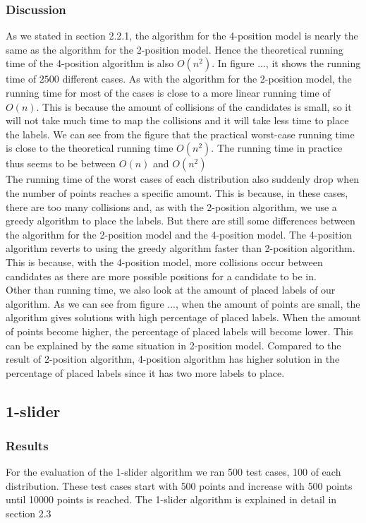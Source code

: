 \documentclass[crop=false,a4paper,oneside,11pt]{standalone}
\begin{document}
\subsubsection{Discussion}
As we stated in section 2.2.1, the algorithm for the 4-position model is nearly the same as the algorithm for the 2-position model. Hence the theoretical running time of the 4-position algorithm is also $O(n^2)$. In figure ..., it shows the running time of $2500$ different cases. As with the algorithm for the 2-position model, the running time for most of the cases is close to a more linear running time of $O(n)$. This is because the amount of collisions of the candidates is small, so it will not take much time to map the collisions and it will take less time to place the labels. We can see from the figure that the practical worst-case running time is close to the theoretical running time $O(n^2)$. The running time in practice thus seems to be between $O(n)$ and $O(n^2)$  \\
The running time of the worst cases of each distribution also suddenly drop when the number of points reaches a specific amount. This is because, in these cases, there are too many collisions and, as with the 2-position algorithm, we use a greedy algorithm to place the labels. But there are still some differences between the algorithm for the 2-position model and the 4-position model. The 4-position algorithm reverts to using the greedy algorithm faster than 2-position algorithm. This is because, with the 4-position model, more collisions occur between candidates as there are more possible positions for a candidate to be in.\\
Other than running time, we also look at the amount of placed labels of our algorithm. As we can see from figure ..., when the amount of points are small, the algorithm gives solutions with high percentage of placed labels. When the amount of points become higher, the percentage of placed labels will become lower. This can be explained by the same situation in 2-position model. Compared to the result of 2-position algorithm, 4-position algorithm has higher solution in the percentage of placed labels since it has two more labels to place.\\


\subsection{1-slider}
\subsubsection{Results}
For the evaluation of the 1-slider algorithm we ran 500 test cases, 100 of each distribution. These test cases start with 500 points and increase with 500 points until 10000 points is reached. The 1-slider algorithm is explained in detail in section 2.3
\end{document}
